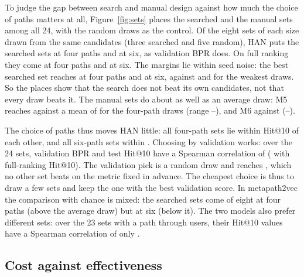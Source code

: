 To judge the gap between search and manual design against how much the choice of paths matters at
all, Figure~\ref{fig:sets} places the searched and the manual sets among all 24, with the random
draws as the control. Of the eight sets of each size drawn from the same 
candidates (three searched and five random), HAN puts the searched sets  at four
paths and  at six, as validation BPR does. On full ranking they come
 at four paths and  at six. The margins lie within seed
noise: the best searched set reaches  at four paths and 
at six, against  and  for the weakest draws. So the places
show that the search does not beat its own candidates, not that every draw beats it. The manual
sets do about as well as an average draw: M5 reaches  against a mean of
 for the four-path draws (range --),
and M6  against 
(--).



The choice of paths thus moves HAN little: all  four-path sets lie within
 Hit@10 of each other, and all  six-path sets within
. Choosing by validation works: over the 24 sets, validation BPR and test Hit@10
have a Spearman correlation of  ( with full-ranking
Hit@10). The validation pick is a random draw and reaches , which no other set
beats on the metric fixed in advance. The cheapest choice is thus to draw a few sets and keep the
one with the best validation score. In metapath2vec the comparison with chance is mixed: the
searched sets come  of eight at four paths (above the average draw) but
 at six (below it). The two models also prefer different sets: over the 23 sets
with a path through users, their Hit@10 values have a Spearman correlation of only
.

\subsection{Cost against effectiveness}
\label{sec:res-cost}


